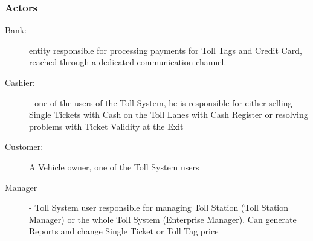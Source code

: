\subsubsection{Actors}
\begin{description}

  \item[Bank:] entity responsible for processing payments for Toll Tags and Credit Card, reached through a dedicated communication channel.
  \item[Cashier:] - one of the users of the Toll System, he is responsible for either selling Single Tickets with Cash on the Toll Lanes with Cash Register or resolving problems with Ticket Validity at the Exit
  \item[Customer:] A Vehicle owner, one of the Toll System users
  \item[Manager] - Toll System user responsible for managing Toll Station (Toll Station Manager) or the whole Toll System (Enterprise Manager). Can generate Reports and change Single Ticket or Toll Tag price

\end{description}

